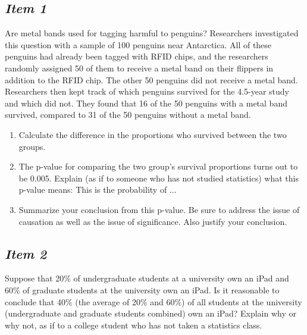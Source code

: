 \subsection{\textbf{\textit{Item 1}}}
Are metal bands used for tagging harmful to penguins?
Researchers investigated this question with a sample of 100 penguins near Antarctica.  All of these penguins had already been tagged with RFID chips, and the researchers randomly assigned 50 of them to receive a metal band on their flippers in addition to the RFID chip. The other 50 penguins did not receive a metal band. Researchers then kept track of which penguins survived for the 4.5-year study and which did not.  They found that 16 of the 50 penguins with a metal band survived, compared to 31 of the 50 penguins without a metal band.  
\begin{enumerate} [leftmargin=1cm, itemsep=.2em]
\item Calculate the difference in the proportions who survived between the two groups.

%
%


\item The p-value for comparing the two group's survival proportions turns out to be 0.005.
Explain (as if to someone who has not studied statistics) what this p-value means: This is the probability of $\ldots$

\item Summarize your conclusion from this p-value.  Be sure to address the issue of causation as well as the issue of significance.  Also justify your conclusion.
\end{enumerate}


\subsection{\textbf{\textit{Item 2}}}
Suppose that 20\% of undergraduate students at a university own an iPad and 60\% of graduate students at the university own an iPad.  Is it reasonable to conclude that 40\% (the average of 20\% and 60\%) of all students at the university (undergraduate and graduate students combined) own an iPad?  Explain why or why not, as if to a college student who has not taken a statistics class.


